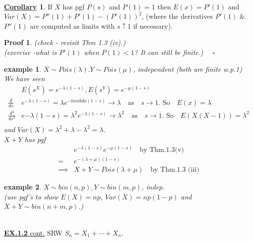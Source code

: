 \documentclass[12pt]{article}
\theoremstyle{definition}
\newtheorem{mycor}{\underline{Corollary}}[section]
\theoremstyle{plain}
\newtheorem*{myproof}{Proof}
\newtheorem*{example}{example}
\begin{document}
$\mbox{}$\\
\begin{mycor}
 If $X$ has pgf $P(s)$ and \underline{\underline{$P(1)=1$}} then $E(x)=P'(1)$ and $Var(X) = P''(1)+P'(1)-(P'(1))^2$, (where the derivatives $P'(1)$ \& $P''(1)$ are computed as limits with $s \uparrow 1$ if necessary).
\end{mycor}
\begin{myproof}
(check - revisit Thm 1.3 (iv).)\\
(exercise -what is $P'(1)$ when $P(1) < 1$? It can still be finite.) $\quad \square$
\end{myproof}
\begin{example}
$X \sim Pois(\lambda). Y \sim Pois(\mu)$, independent (both are finite w.p.1)\\
We have seen 
\begin{displaymath}
\begin{aligned}
&E(s^X) = e^{-\lambda (1-s)}, E(s^Y) = e^{-\mu(1-s)} \\
\frac{d}{ds} &e^{-\lambda(1-s)} = \lambda e^{-lambda (1-s)} \rightarrow \lambda \quad \mbox{as} \quad s \rightarrow 1 \mbox{. So} \quad E(x) = \lambda \\
\frac{d^2}{ds^2}&e{-\lambda(1-s)} = \lambda^2 e^{-\lambda(1-s)} \rightarrow \lambda^2 \quad \mbox{as} \quad s \rightarrow 1 \mbox{. So} \quad E(X(X-1)) = \lambda^2 \\
\end{aligned}
\end{displaymath}
and $Var(X) = \lambda^2 + \lambda - \lambda^2 = \lambda$. \\
$X + Y$ has pgf 
\begin{displaymath}
\begin{aligned}
&e^{-\lambda(1-s)}e^{-\mu(1-s)} \quad \mbox{by Thm.1.3(v)} \\
= &e^{-(\lambda + \mu)(1-s)} \\
 \implies &X+Y \sim Pois(\lambda + \mu) \quad \mbox{by Thm.1.3 (iii)}
\end{aligned}
\end{displaymath}
\end{example}
\begin{example}
$X \sim bin(n,p), Y \sim bin(m,p)$, indep. \\
(use pgf's to show $E(X) = np$, $Var(X) = np(1-p)$ and $X+Y \sim bin(n+m, p)$.) 
\end{example}
$\mbox{}$\\
\underline{\textbf{EX.1.2} cont.}  SRW $S_n = X_1 + \cdots + X_n$.\\
\end{document}
